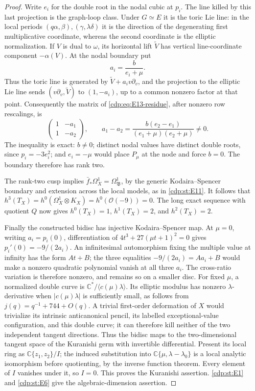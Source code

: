 \begin{proof}
Write $e_i$ for the double root in the nodal cubic at $p_i$.
The line killed by this last projection is the graph-loop class.
Under $G\simeq E$ it is the toric Lie line: in the local periods
$(q\alpha,\beta),(\gamma,\lambda\delta)$ it is the direction
of the degenerating first multiplicative coordinate, whereas the
second coordinate is the elliptic normalization. If $V$ is dual to
$\omega$, its horizontal lift $\widetilde V$ has vertical
line-coordinate component $-\alpha(V)$. At the nodal boundary put
\[
 a_i=\frac{b}{e_i+\mu}.
\]
Thus the toric line is generated by
$\widetilde V+a_i v\partial_v$, and the projection to the elliptic
Lie line sends $(v\partial_v,\widetilde V)$ to $(1,-a_i)$, up to
a common nonzero factor at that point. Consequently the matrix of
\eqref{cdp:eq:E13-residue}, after nonzero row rescalings, is
\[
 \begin{pmatrix}1&-a_1\\1&-a_2\end{pmatrix},\qquad
 a_1-a_2=\frac{b(e_2-e_1)}{(e_1+\mu)(e_2+\mu)}\ne0.
\]
The inequality is exact: $b\ne0$; distinct nodal values have
distinct double roots, since $p_i=-3e_i^2$; and $e_i=-\mu$ would
place $P_\mu$ at the node and force $b=0$. The boundary therefore
has rank two.

The rank-two cusp implies
$\bar f_*\Omega_X^1=\Omega_{\mathfrak B}^1$, by the generic
Kodaira--Spencer boundary and extension across the local models,
as in \ref{cdp:st:E11}. It follows that
$h^3(T_X)=h^0(\Omega_X^1\otimes K_X)
=h^0(\mathcal O(-9))=0$. The long exact sequence with quotient
$Q$ now gives $h^0(T_X)=1$, $h^1(T_X)=2$, and $h^2(T_X)=2$.

Finally the constructed bidisc has injective Kodaira--Spencer map.
At $\mu=0$, writing $a_i=p_i(0)$, differentiation of
$4t^3+27(\mu t+1)^2=0$ gives $p_i'(0)=-9/(2a_i)$.
An infinitesimal automorphism fixing the multiple value at infinity
has the form $At+B$; the three equalities
$-9/(2a_i)=Aa_i+B$ would make a nonzero quadratic polynomial vanish
at all three $a_i$. The cross-ratio variation is therefore nonzero,
and remains so on a smaller disc. For fixed $\mu$, a normalized
double curve is $\mathbb C^*/\langle c(\mu)\lambda\rangle$.
Its elliptic modulus has nonzero $\lambda$-derivative when
$|c(\mu)\lambda|$ is sufficiently small, as follows from
$j(q)=q^{-1}+744+O(q)$. A trivial first-order deformation of $X$
would trivialize its intrinsic anticanonical pencil, its labelled
exceptional-value configuration, and this double curve; it can
therefore kill neither of the two independent tangent directions.
Thus the bidisc maps to the two-dimensional tangent space of the
Kuranishi germ with invertible differential. Present its local
ring as $\mathbb C\{z_1,z_2\}/I$; the induced substitution into
$\mathbb C\{\mu,\lambda-\lambda_0\}$ is a local analytic
isomorphism before quotienting, by the inverse function theorem.
Every element of $I$ vanishes under it, so $I=0$. This proves the
Kuranishi assertion. \ref{cdp:st:E1} and \ref{cdp:st:E6} give the algebraic-dimension assertion.
\end{proof}


